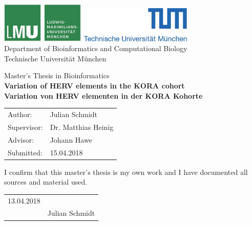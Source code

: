 \documentclass[a4paper,12pt,twoside,openright]{article}
\begin{document}
\begin{titlepage}
{\sffamily


\begin{center}
\includegraphics[width=0.3\textwidth]{../figures/LMU-logo.jpg}
\hfill
\includegraphics[width=0.4\textwidth]{../figures/TUM-logo.jpg}  
\\[1.5cm]  

{\LARGE Department of Bioinformatics and Computational Biology}\\[0.5cm]
{Technische Universit\"at M\"unchen}\\[1cm]
\begin{spacing}{1.6}
{\Large Master's Thesis in Bioinformatics}\\[1.6cm]
{\textbf{\LARGE Variation of HERV elements in the KORA cohort}}\\[1.6cm]
{\textbf{\LARGE Variation von HERV elementen in der KORA Kohorte}}\\[3.6cm]
\end{spacing}

\end{center}
\begin{center}\Large
  \begin{tabular}{ll}
    Author:& Julian Schmidt\\
    Supervisor: & Dr. Matthias Heinig\\
    Advisor:        & Johann Hawe\\
    Submitted:     &  15.04.2018\\
  \end{tabular}
\end{center}

}%
\end{titlepage}


\vspace*{6cm}
\begin{center}
\begin{minipage}{.6\textwidth}
I confirm that this master's thesis is my own work and I have documented all sources and material used.
\\[2cm]
\begin{tabular}{p{} p{}}
13.04.2018 & \hrulefill \\
& \hspace{1.95cm} Julian Schmidt
\end{tabular}
\end{minipage}
\end{center}
\end{document}
